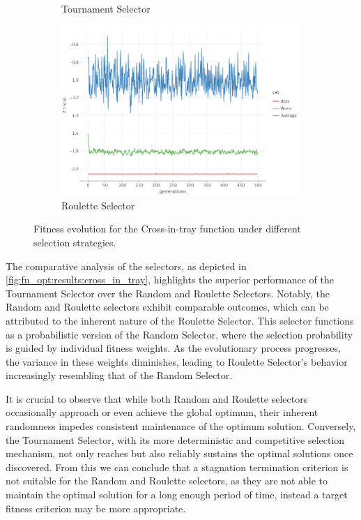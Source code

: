 \begin{figure}[ht!]
\begin{subfigure}{.45\textwidth}
            \caption{Tournament Selector}
        \end{subfigure}
        \begin{subfigure}{.45\textwidth}
            \centering
            \includegraphics[width=\linewidth]{img/cross_in_tray_roulette.png}
            \caption{Roulette Selector}
        \end{subfigure}
        \caption{Fitness evolution for the Cross-in-tray function under different selection strategies.}
        \label{fig:fn_opt:results:cross_in_tray}
    \end{figure}

    The comparative analysis of the selectors, as depicted in \vref{fig:fn_opt:results:cross_in_tray}, highlights the 
    superior performance of the Tournament Selector over the Random and Roulette Selectors. Notably, the Random and 
    Roulette selectors exhibit comparable outcomes, which can be attributed to the inherent nature of the Roulette 
    Selector. This selector functions as a probabilistic version of the Random Selector, where the selection probability 
    is guided by individual fitness weights. As the evolutionary process progresses, the variance in these weights 
    diminishes, leading to Roulette Selector's behavior increasingly resembling that of the Random Selector.

    It is crucial to observe that while both Random and Roulette selectors occasionally approach or even achieve the
    global optimum, their inherent randomness impedes consistent maintenance of the optimum solution. Conversely, the 
    Tournament Selector, with its more deterministic and competitive selection mechanism, not only reaches but also 
    reliably sustains the optimal solutions once discovered. From this we can conclude that a stagnation termination
    criterion is not suitable for the Random and Roulette selectors, as they are not able to maintain the optimal 
    solution for a long enough period of time, instead a target fitness criterion may be more appropriate.

